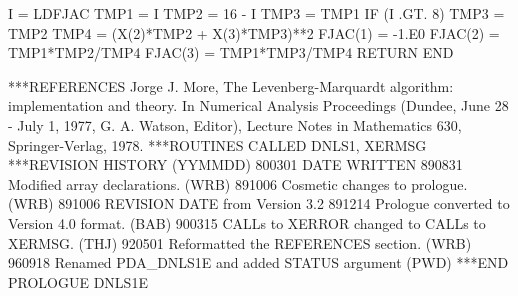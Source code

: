 \documentclass[11pt,twoside,nolof]{starlink}
\begin{document}
\begin{terminalv}
       I = LDFJAC
          TMP1 = I
          TMP2 = 16 - I
          TMP3 = TMP1
          IF (I .GT. 8) TMP3 = TMP2
          TMP4 = (X(2)*TMP2 + X(3)*TMP3)**2
          FJAC(1) = -1.E0
          FJAC(2) = TMP1*TMP2/TMP4
          FJAC(3) = TMP1*TMP3/TMP4
       RETURN
       END

***REFERENCES  Jorge J. More, The Levenberg-Marquardt algorithm:
                 implementation and theory.  In Numerical Analysis
                 Proceedings (Dundee, June 28 - July 1, 1977, G. A.
                 Watson, Editor), Lecture Notes in Mathematics 630,
                 Springer-Verlag, 1978.
***ROUTINES CALLED  DNLS1, XERMSG
***REVISION HISTORY  (YYMMDD)
   800301  DATE WRITTEN
   890831  Modified array declarations.  (WRB)
   891006  Cosmetic changes to prologue.  (WRB)
   891006  REVISION DATE from Version 3.2
   891214  Prologue converted to Version 4.0 format.  (BAB)
   900315  CALLs to XERROR changed to CALLs to XERMSG.  (THJ)
   920501  Reformatted the REFERENCES section.  (WRB)
   960918  Renamed PDA_DNLS1E and added STATUS argument (PWD)
***END PROLOGUE  DNLS1E
\end{terminalv}

\end{document}
